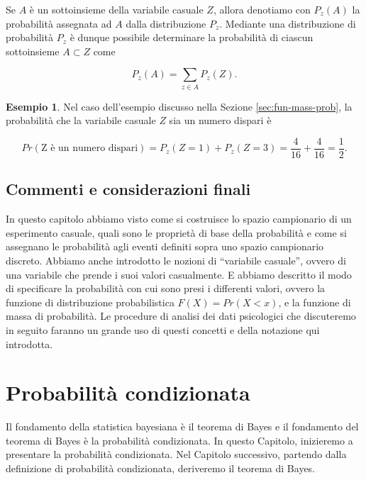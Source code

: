 \documentclass[
  11pt,
]{krantz}
\theoremstyle{definition}
\theoremstyle{definition}
\newtheorem{example}{Esempio}[chapter]
\theoremstyle{definition}
\theoremstyle{definition}
\theoremstyle{remark}
\begin{document}
Se \(A\) è un sottoinsieme della variabile casuale \(Z\), allora denotiamo con \(P_{z}(A)\) la probabilità assegnata ad \(A\) dalla distribuzione \(P_{z}\). Mediante una distribuzione di probabilità \(P_{z}\) è dunque possibile determinare la probabilità di ciascun sottoinsieme \(A \subset Z\) come

\[
P_{z}(A) = \sum_{z \in A} P_{z}(Z).
\]

\begin{example}
Nel caso dell'esempio discusso nella Sezione \ref{sec:fun-mass-prob}, la probabilità che la variabile casuale \(Z\) sia un numero dispari è

\[
Pr(\text{Z è un numero dispari}) = P_{z}(Z = 1) + P_{z}(Z = 3) = \frac{4}{16} + \frac{4}{16} = \frac{1}{2}.
\]
\end{example}

\hypertarget{commenti-e-considerazioni-finali}{%
\section*{Commenti e considerazioni finali}\label{commenti-e-considerazioni-finali}}


In questo capitolo abbiamo visto come si costruisce lo spazio campionario di un esperimento casuale, quali sono le proprietà di base della probabilità e come si assegnano le probabilità agli eventi definiti sopra uno spazio campionario discreto. Abbiamo anche introdotto le nozioni di ``variabile casuale'', ovvero di una variabile che prende i suoi valori casualmente. E abbiamo descritto il modo di specificare la probabilità con cui sono presi i differenti valori, ovvero la funzione di distribuzione probabilistica \(F(X) = Pr(X < x)\), e la funzione di massa di probabilità. Le procedure di analisi dei dati psicologici che discuteremo in seguito faranno un grande uso di questi concetti e della notazione qui introdotta.

\hypertarget{chapter-prob-cond}{%
\chapter{Probabilità condizionata}\label{chapter-prob-cond}}

Il fondamento della statistica bayesiana è il teorema di Bayes e il fondamento del teorema di Bayes è la probabilità condizionata. In questo Capitolo, inizieremo a presentare la probabilità condizionata. Nel Capitolo successivo, partendo dalla definizione di probabilità condizionata, deriveremo il teorema di Bayes.
\end{document}
